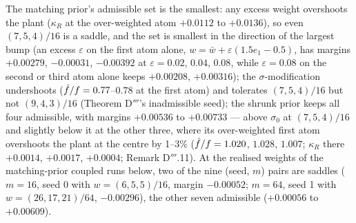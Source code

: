 The matching prior's admissible set is the smallest: any excess weight overshoots the plant ($\kappa_R$ at the
over-weighted atom $+0.0112$ to $+0.0136$), so even $(7,5,4)/16$ is a saddle, and the set is smallest in the
direction of the largest bump (an excess $\varepsilon$ on the first atom alone,
$w = \bar w + \varepsilon(1.5e_1 - 0.5)$, has margins $+0.00279$, $-0.00031$, $-0.00392$ at $\varepsilon = 0.02$,
$0.04$, $0.08$, while $\varepsilon = 0.08$ on the second or third atom alone keeps $+0.00208$, $+0.00316$); the
$\sigma$-modification undershoots ($\hat f/f = 0.77$--$0.78$ at the first atom) and tolerates $(7,5,4)/16$ but not
$(9,4,3)/16$ (Theorem D$'''$'s inadmissible seed); the shrunk prior keeps all four admissible, with margins
$+0.00536$ to $+0.00733$ --- above $\sigma_0$ at $(7,5,4)/16$ and slightly below it at the other three, where its
over-weighted first atom overshoots the plant at the centre by 1--3\% ($\hat f/f = 1.020$, $1.028$, $1.007$;
$\kappa_R$ there $+0.0014$, $+0.0017$, $+0.0004$; Remark D$'''$.11). At the realised weights of the matching-prior
coupled runs below, two of the nine (seed, $m$) pairs are saddles ($m = 16$, seed 0 with $w = (6,5,5)/16$, margin
$-0.00052$; $m = 64$, seed 1 with $w = (26,17,21)/64$, $-0.00296$), the other seven admissible ($+0.00056$ to
$+0.00609$).

